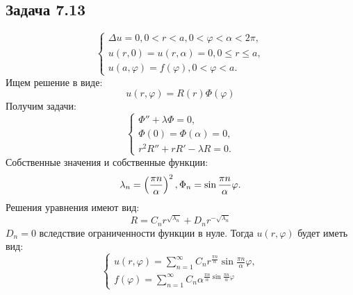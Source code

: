 \documentclass[11pt]{article}
\begin{document}
\subsection{Задача 7.13}
\label{sec:orga7cd70a}
\begin{equation}
\begin{cases}
\Delta u = 0, 0 < r < a, 0 < \varphi < \alpha < 2\pi, \\
u(r, 0) = u(r, \alpha) = 0, 0 \leq r \leq a, \\
u(a, \varphi) = f(\varphi), 0 < \varphi < a.
\end{cases}
\end{equation}
Ищем решение в виде:
\begin{equation}
u(r, \varphi) = R(r)\Phi(\varphi)
\end{equation}
Получим задачи:
\begin{equation}
\begin{cases}
\Phi'' + \lambda\Phi = 0, \\
\Phi(0) = \Phi(\alpha) = 0, \\
r^2R'' + rR' - \lambda R = 0.
\end{cases}
\end{equation}
Собственные значения и собственные функции:
\begin{equation}
\lambda_n = \left(\frac{\pi n}\alpha\right)^2, \\
\Phi_n = \sin\frac{\pi n}\alpha\varphi.
\end{equation}
Решения уравнения имеют вид:
\begin{equation}
R = C_nr^{\sqrt{\lambda_n}} + D_nr^{-\sqrt{\lambda_n}}
\end{equation}
$D_n = 0$ вследствие ограниченности функции в нуле. Тогда $u(r, \varphi)$ будет иметь вид:
\begin{equation}
\begin{cases}
u(r, \varphi) = \sum_{n = 1}^{\infty}C_nr^{\frac{\pi n}{\alpha}}\sin\frac{\pi n}{\alpha}\varphi, \\
f(\varphi) = \sum_{n = 1}^{\infty}C_n\alpha^{\frac{\pi n}{\alpha}\sin\frac{\pi n}{\alpha}\varphi}
\end{cases}
\end{equation}
\end{document}
